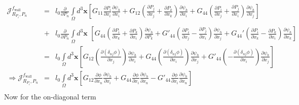 \documentclass[16pt]{article} %
\begin{document}
\begin{eqnarray}\nonumber
\mathscr{J}_{R_{P_i},P_n}^{f_\mathrm{wall}} &=&l_0\frac{\partial}{\partial P_n} \int\limits_\Omega d^3 {\boldsymbol x} \left[G_{11} \frac{\partial P_i}{\partial x_i} \frac{\partial \psi_h}{\partial x_i} + G_{12} \left(\frac{\partial P_j}{\partial x_j} + \frac{\partial P_k}{\partial x_k} \right) \frac{\partial \psi_h}{\partial x_i} + G_{44} \left(\frac{\partial P_i}{\partial x_j} + \frac{\partial P_j}{\partial x_i} \right)\frac{\partial \psi_h}{\partial x_j} \right]\\ \nonumber\\ \nonumber
&+&l_0 \frac{\partial}{\partial P_n} \int\limits_\Omega d^3 {\boldsymbol x} \,\,\left[ G_{44} \left(\frac{\partial P_i}{\partial x_k} + \frac{\partial P_k}{\partial x_i} \right) \frac{\partial \psi_h}{\partial P_k} + G'_{44} \left(\frac{\partial P_i}{\partial x_j}  - \frac{\partial P_j}{\partial x_i}\right) \frac{\partial \psi_h}{\partial x_j} + G_{44}' \left(\frac{\partial P_i}{\partial x_k} - \frac{\partial P_k}{\partial x_i} \right) \frac{\partial \psi_h}{\partial x_k}\right]\\ \nonumber
&=&l_0 \int\limits_\Omega d^3 {\boldsymbol x} \left[ G_{12} \left(\frac{\partial ( \delta_{nj} \phi )}{\partial x_j}  \right) \frac{\partial \psi_h}{\partial x_i} + G_{44} \left(\frac{\partial (\delta_{nj} \phi)}{\partial x_i} \right)\frac{\partial \psi_h}{\partial x_j}  + G'_{44} \left(- \frac{\partial (\delta_{nj} \phi)}{\partial x_i}\right) \frac{\partial \psi_h}{\partial x_j} \right]\\ \nonumber
\Rightarrow \mathscr{J}_{R_{P_i},P_n}^{f_\mathrm{wall}} &=&l_0 \int\limits_\Omega d^3 {\boldsymbol x} \left[ G_{12} \frac{\partial  \phi }{\partial x_n}  \frac{\partial \psi_h}{\partial x_i} + G_{44} \frac{\partial \phi}{\partial x_i} \frac{\partial \psi_h}{\partial x_n}  - G'_{44} \frac{\partial \phi}{\partial x_i} \frac{\partial \psi_h}{\partial x_n} \right]\\ \nonumber
\end{eqnarray}
%
Now for the on-diagonal term
%
\end{document}
